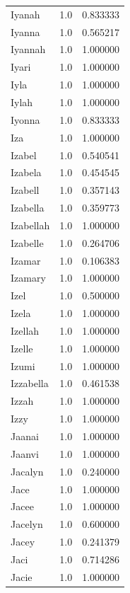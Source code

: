 \documentclass[
  letterpaper,
  DIV=11,
  numbers=noendperiod]{scrreprt}
\begin{document}
\begin{tabular}{lrr}
Iyanah          &   1.0 &   0.833333 \\
Iyanna          &   1.0 &   0.565217 \\
Iyannah         &   1.0 &   1.000000 \\
Iyari           &   1.0 &   1.000000 \\
Iyla            &   1.0 &   1.000000 \\
Iylah           &   1.0 &   1.000000 \\
Iyonna          &   1.0 &   0.833333 \\
Iza             &   1.0 &   1.000000 \\
Izabel          &   1.0 &   0.540541 \\
Izabela         &   1.0 &   0.454545 \\
Izabell         &   1.0 &   0.357143 \\
Izabella        &   1.0 &   0.359773 \\
Izabellah       &   1.0 &   1.000000 \\
Izabelle        &   1.0 &   0.264706 \\
Izamar          &   1.0 &   0.106383 \\
Izamary         &   1.0 &   1.000000 \\
Izel            &   1.0 &   0.500000 \\
Izela           &   1.0 &   1.000000 \\
Izellah         &   1.0 &   1.000000 \\
Izelle          &   1.0 &   1.000000 \\
Izumi           &   1.0 &   1.000000 \\
Izzabella       &   1.0 &   0.461538 \\
Izzah           &   1.0 &   1.000000 \\
Izzy            &   1.0 &   1.000000 \\
Jaanai          &   1.0 &   1.000000 \\
Jaanvi          &   1.0 &   1.000000 \\
Jacalyn         &   1.0 &   0.240000 \\
Jace            &   1.0 &   1.000000 \\
Jacee           &   1.0 &   1.000000 \\
Jacelyn         &   1.0 &   0.600000 \\
Jacey           &   1.0 &   0.241379 \\
Jaci            &   1.0 &   0.714286 \\
Jacie           &   1.0 &   1.000000 \\

\end{tabular}
\end{document}
